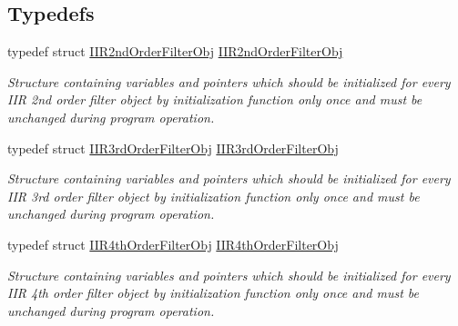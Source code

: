 \subsection*{Typedefs}
\begin{DoxyCompactItemize}
\item 
typedef struct \mbox{\hyperlink{struct_i_i_r2nd_order_filter_obj}{I\+I\+R2nd\+Order\+Filter\+Obj}} \mbox{\hyperlink{group___i_i_rfilter_pt_by_pt_ga8546a467eb7a73cec439600d41273514_ga8546a467eb7a73cec439600d41273514}{I\+I\+R2nd\+Order\+Filter\+Obj}}
\begin{DoxyCompactList}\small\item\em Structure containing variables and pointers which should be initialized for every I\+IR 2nd order filter object by initialization function only once and must be unchanged during program operation. \end{DoxyCompactList}\item 
typedef struct \mbox{\hyperlink{struct_i_i_r3rd_order_filter_obj}{I\+I\+R3rd\+Order\+Filter\+Obj}} \mbox{\hyperlink{group___i_i_rfilter_pt_by_pt_ga28932217270b94db6230648e203eb4ea_ga28932217270b94db6230648e203eb4ea}{I\+I\+R3rd\+Order\+Filter\+Obj}}
\begin{DoxyCompactList}\small\item\em Structure containing variables and pointers which should be initialized for every I\+IR 3rd order filter object by initialization function only once and must be unchanged during program operation. \end{DoxyCompactList}\item 
typedef struct \mbox{\hyperlink{struct_i_i_r4th_order_filter_obj}{I\+I\+R4th\+Order\+Filter\+Obj}} \mbox{\hyperlink{group___i_i_rfilter_pt_by_pt_ga926ddf6d792e658ea77b7321c3d4fe0d_ga926ddf6d792e658ea77b7321c3d4fe0d}{I\+I\+R4th\+Order\+Filter\+Obj}}
\begin{DoxyCompactList}\small\item\em Structure containing variables and pointers which should be initialized for every I\+IR 4th order filter object by initialization function only once and must be unchanged during program operation. \end{DoxyCompactList}\end{DoxyCompactItemize}
